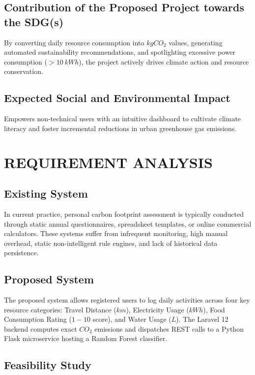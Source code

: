 \documentclass[12pt,a4paper]{report}
\begin{document}
\section{Contribution of the Proposed Project towards the SDG(s)}
By converting daily resource consumption into $kg CO_2$ values, generating automated sustainability recommendations, and spotlighting excessive power consumption ($> 10\ kWh$), the project actively drives climate action and resource conservation.

\section{Expected Social and Environmental Impact}
Empowers non-technical users with an intuitive dashboard to cultivate climate literacy and foster incremental reductions in urban greenhouse gas emissions.

\chapter{REQUIREMENT ANALYSIS}

\section{Existing System}
In current practice, personal carbon footprint assessment is typically conducted through static annual questionnaires, spreadsheet templates, or online commercial calculators. These systems suffer from infrequent monitoring, high manual overhead, static non-intelligent rule engines, and lack of historical data persistence.

\section{Proposed System}
The proposed system allows registered users to log daily activities across four key resource categories: Travel Distance ($km$), Electricity Usage ($kWh$), Food Consumption Rating ($1-10$ score), and Water Usage ($L$). The Laravel 12 backend computes exact $CO_2$ emissions and dispatches REST calls to a Python Flask microservice hosting a Random Forest classifier.

\section{Feasibility Study}
\end{document}
